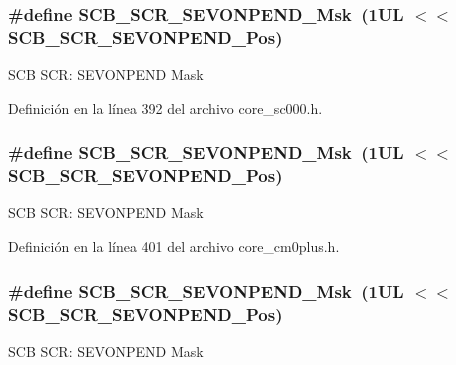 \subsubsection[{\texorpdfstring{S\+C\+B\+\_\+\+S\+C\+R\+\_\+\+S\+E\+V\+O\+N\+P\+E\+N\+D\+\_\+\+Msk}{SCB_SCR_SEVONPEND_Msk}}]{\setlength{\rightskip}{0pt plus 5cm}\#define S\+C\+B\+\_\+\+S\+C\+R\+\_\+\+S\+E\+V\+O\+N\+P\+E\+N\+D\+\_\+\+Msk~(1\+U\+L $<$$<$ S\+C\+B\+\_\+\+S\+C\+R\+\_\+\+S\+E\+V\+O\+N\+P\+E\+N\+D\+\_\+\+Pos)}\hypertarget{group___c_m_s_i_s___s_c_b_gafb98656644a14342e467505f69a997c9}{}\label{group___c_m_s_i_s___s_c_b_gafb98656644a14342e467505f69a997c9}
S\+CB S\+CR\+: S\+E\+V\+O\+N\+P\+E\+ND Mask 

Definición en la línea 392 del archivo core\+\_\+sc000.\+h.

\subsubsection[{\texorpdfstring{S\+C\+B\+\_\+\+S\+C\+R\+\_\+\+S\+E\+V\+O\+N\+P\+E\+N\+D\+\_\+\+Msk}{SCB_SCR_SEVONPEND_Msk}}]{\setlength{\rightskip}{0pt plus 5cm}\#define S\+C\+B\+\_\+\+S\+C\+R\+\_\+\+S\+E\+V\+O\+N\+P\+E\+N\+D\+\_\+\+Msk~(1\+U\+L $<$$<$ S\+C\+B\+\_\+\+S\+C\+R\+\_\+\+S\+E\+V\+O\+N\+P\+E\+N\+D\+\_\+\+Pos)}\hypertarget{group___c_m_s_i_s___s_c_b_gafb98656644a14342e467505f69a997c9}{}\label{group___c_m_s_i_s___s_c_b_gafb98656644a14342e467505f69a997c9}
S\+CB S\+CR\+: S\+E\+V\+O\+N\+P\+E\+ND Mask 

Definición en la línea 401 del archivo core\+\_\+cm0plus.\+h.

\subsubsection[{\texorpdfstring{S\+C\+B\+\_\+\+S\+C\+R\+\_\+\+S\+E\+V\+O\+N\+P\+E\+N\+D\+\_\+\+Msk}{SCB_SCR_SEVONPEND_Msk}}]{\setlength{\rightskip}{0pt plus 5cm}\#define S\+C\+B\+\_\+\+S\+C\+R\+\_\+\+S\+E\+V\+O\+N\+P\+E\+N\+D\+\_\+\+Msk~(1\+U\+L $<$$<$ S\+C\+B\+\_\+\+S\+C\+R\+\_\+\+S\+E\+V\+O\+N\+P\+E\+N\+D\+\_\+\+Pos)}\hypertarget{group___c_m_s_i_s___s_c_b_gafb98656644a14342e467505f69a997c9}{}\label{group___c_m_s_i_s___s_c_b_gafb98656644a14342e467505f69a997c9}
S\+CB S\+CR\+: S\+E\+V\+O\+N\+P\+E\+ND Mask 

